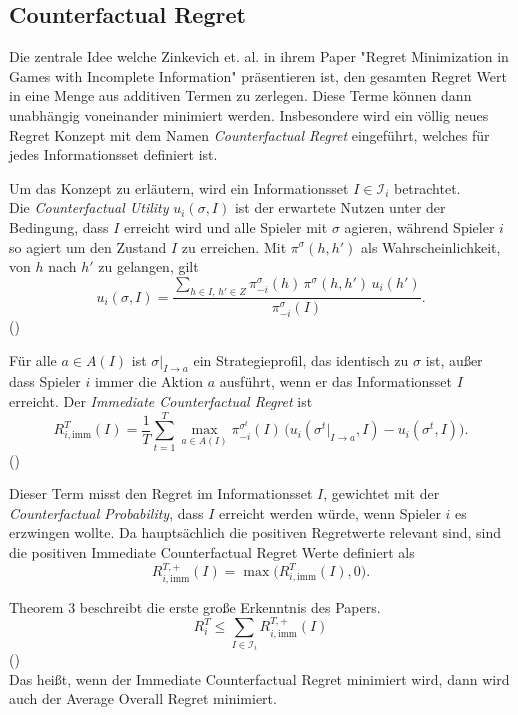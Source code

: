 \subsection{Counterfactual Regret}
Die zentrale Idee welche Zinkevich et. al. in ihrem Paper "Regret Minimization in Games with Incomplete Information" präsentieren ist, den gesamten Regret Wert in eine Menge aus additiven Termen zu zerlegen.
Diese Terme können dann unabhängig voneinander minimiert werden.
Insbesondere wird ein völlig neues Regret Konzept mit dem Namen \emph{Counterfactual Regret} eingeführt, welches für jedes Informationsset definiert ist.

Um das Konzept zu erläutern, wird ein Informationsset $I \in \mathcal{I}_i$ betrachtet.\\
Die \emph{Counterfactual Utility} $u_i(\sigma, I)$ ist der erwartete Nutzen unter der Bedingung, dass $I$ erreicht wird und alle Spieler mit $\sigma$ agieren, während Spieler $i$ so agiert um den Zustand $I$ zu erreichen.
Mit $\pi^\sigma(h, h')$ als Wahrscheinlichkeit, von $h$ nach $h'$ zu gelangen, gilt
\begin{equation}
u_i(\sigma, I) = \frac{\sum_{h \in I,\, h' \in Z} \pi_{-i}^\sigma(h)\,\pi^\sigma(h, h')\,u_i(h')}{\pi_{-i}^\sigma(I)}.
\end{equation}
(\cite[Eq.~5]{zinkevich2007regret})

Für alle $a \in A(I)$ ist $\sigma|_{I \to a}$ ein Strategieprofil, das identisch zu $\sigma$ ist, außer dass Spieler $i$ immer die Aktion $a$ ausführt, wenn er das Informationsset $I$ erreicht.
Der \emph{Immediate Counterfactual Regret} ist
\begin{equation}
R_{i,\mathrm{imm}}^{T}(I) = \frac{1}{T}\sum_{t=1}^{T} \max_{a \in A(I)} \pi_{-i}^{\sigma^t}(I)\,\bigl(u_i(\sigma^t|_{I \to a}, I) - u_i(\sigma^t, I)\bigr).
\end{equation}
(\cite[Eq.~6]{zinkevich2007regret})

Dieser Term misst den Regret im Informationsset $I$, gewichtet mit der \emph{Counterfactual Probability}, dass $I$ erreicht werden würde, wenn Spieler $i$ es erzwingen wollte.
Da hauptsächlich die positiven Regretwerte relevant sind, sind die positiven Immediate Counterfactual Regret Werte definiert als
\begin{equation}
R_{i,\mathrm{imm}}^{T,+}(I) = \max\!\bigl(R_{i,\mathrm{imm}}^{T}(I), 0\bigr).
\end{equation}

Theorem 3 beschreibt die erste große Erkenntnis des Papers. 
\begin{equation}
    R_i^T \le \sum_{I \in \mathcal{I}_i} R_{i,\mathrm{imm}}^{T,+}(I)
\end{equation}
(\cite[Thm.~3]{zinkevich2007regret})\\
Das heißt, wenn der Immediate Counterfactual Regret minimiert wird, dann wird auch der Average Overall Regret minimiert.
